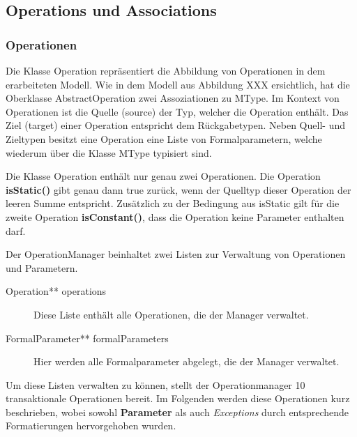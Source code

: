 \subsection{Operations und Associations}

\subsubsection{Operationen}

Die Klasse Operation repräsentiert die Abbildung von Operationen in dem erarbeiteten Modell.
Wie in dem Modell aus Abbildung XXX ersichtlich, hat die Oberklasse AbstractOperation zwei  Assoziationen zu MType. 
Im Kontext von Operationen ist die Quelle (source) der Typ, welcher die Operation enthält. 
Das Ziel (target) einer Operation entspricht dem Rückgabetypen.
Neben Quell- und Zieltypen besitzt eine Operation eine Liste von Formalparametern, welche 
wiederum über die Klasse MType typisiert sind.

Die Klasse Operation enthält nur genau zwei Operationen.
Die Operation \textbf{isStatic()} gibt genau dann true zurück, wenn der Quelltyp dieser Operation der leeren Summe entspricht.
Zusätzlich zu der Bedingung aus isStatic gilt für die zweite Operation \textbf{isConstant()}, dass die Operation keine Parameter enthalten darf. 



Der OperationManager beinhaltet zwei Listen zur Verwaltung von Operationen und Parametern.

\begin{description}
\item[Operation** operations] Diese Liste enthält alle Operationen, die der Manager verwaltet.
\item[FormalParameter** formalParameters] Hier werden alle Formalparameter abgelegt, die der Manager verwaltet.
\end{description}

Um diese Listen verwalten zu können, stellt der Operationmanager 10 transaktionale Operationen bereit.
Im Folgenden werden diese Operationen kurz beschrieben, wobei sowohl \textbf{Parameter} als auch \emph{Exceptions} durch entsprechende Formatierungen hervorgehoben wurden.

